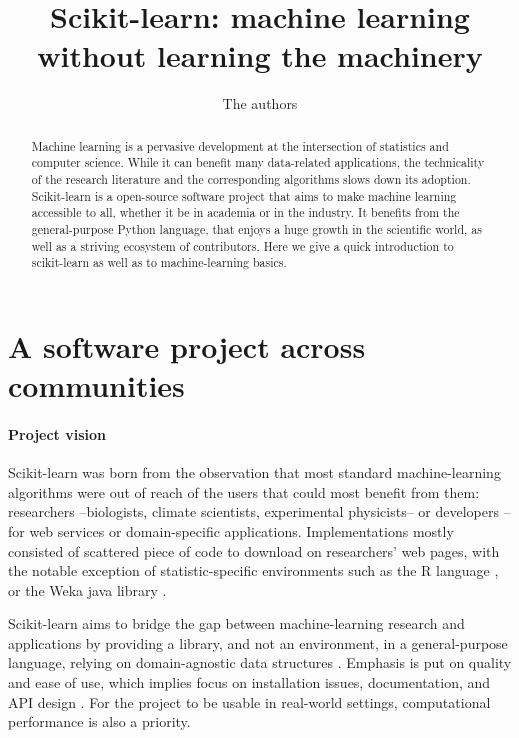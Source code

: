 \documentclass[a4paper]{article}
\title{Scikit-learn: machine learning without learning the machinery}
\author{The authors}
\begin{document}
\maketitle

\begin{abstract}
Machine learning is a pervasive development at the intersection of
statistics and computer science. While it can benefit many
data-related applications, the technicality of the research literature
and the corresponding algorithms slows down its adoption. Scikit-learn is
a open-source software project that aims to make machine learning
accessible to all, whether it be in academia or in the industry. It
benefits from 
the general-purpose Python language, that enjoys a huge growth in
the scientific world, as well as a striving ecosystem of contributors.
Here we give a quick introduction to scikit-learn as well as to
machine-learning basics.
\end{abstract}

\section{A software project across communities}

\paragraph{Project vision}
%
Scikit-learn was born from the observation that most standard
machine-learning algorithms were out of reach of the users that could
most benefit from them: researchers --biologists, climate
scientists, experimental physicists-- or developers --for web
services or domain-specific applications.
%
Implementations mostly consisted of scattered piece of code to download
on researchers' web pages, with the notable exception of
statistic-specific environments such as the R language \cite{Rmanual}, or
the Weka java library \cite{hall2009weka}.

Scikit-learn aims to bridge the gap between machine-learning research and
applications by providing a library, and not an environment, in a
general-purpose language, relying on domain-agnostic data structures
\cite{pedregosa2011}. Emphasis is put on quality and ease of use, which
implies focus on installation issues, documentation, and API design
\cite{buitinck2013ecml}. For the project to be usable in real-world
settings, computational performance is also a priority.
\end{document}
